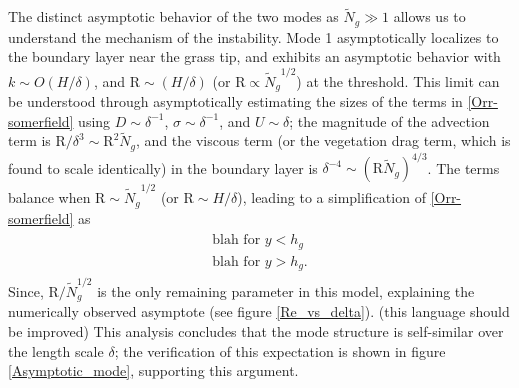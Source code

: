 \documentclass[aps,prl,twocolumn,superscriptaddress,10pt]{revtex4-1}  %
\newcommand{\hg}{h_g}
\newcommand{\Rey}{\text{R}}
\newcommand{\Ndg}{\tilde{N}_g}
\begin{document}
The distinct asymptotic behavior of the two modes as $\Ndg \gg 1$ allows us to understand the mechanism of the instability. 
Mode 1 asymptotically localizes to the boundary layer near the grass tip, and exhibits an asymptotic behavior with $k \sim O(H/\delta)$, and $\Rey \sim (H/\delta)$ (or $\Rey \propto {\Ndg}^{1/2}$) at the threshold. 
This limit can be understood through asymptotically estimating the sizes of the terms in \eqref{Orr-somerfield} using $D\sim \delta^{-1}$, $\sigma \sim \delta^{-1}$, and $U\sim \delta$; the magnitude of the advection term is $\Rey/\delta^3 \sim \Rey^2 \Ndg $, and the viscous term (or the vegetation drag term, which is found to scale identically) in the boundary layer is $\delta^{-4} \sim (\Rey \Ndg)^{4/3}$. 
The terms balance when $\Rey \sim {\Ndg}^{1/2}$ (or $\Rey \sim H/\delta$), leading to a simplification of \eqref{Orr-somerfield} as
\begin{align}
 \begin{split}
  \text{blah for $y<\hg$} \\
  \text{blah for $y>\hg$.}
 \end{split}
\end{align}
Since, $\Rey/\Ndg^{1/2}$ is the only remaining parameter in this model, explaining the numerically observed asymptote (see figure \ref{Re_vs_delta}). (this language should be improved)
This analysis concludes that the mode structure is self-similar over the length scale $\delta$; the verification of this expectation is shown in figure \ref{Asymptotic_mode}, supporting this argument.
\end{document}
